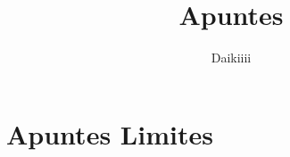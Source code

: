 \documentclass[a4paper]{article}
\title{Apuntes}
\author{Daikiiii}
\begin{document}
\maketitle
\section{Apuntes Limites}
\end{document}
